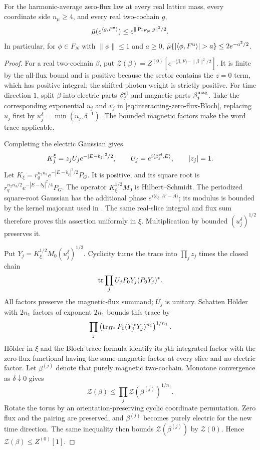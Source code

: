 \begin{proposition}\label{prop:interacting-zero-flux-domination}
For the harmonic-average zero-flux law at every
real lattice mass, every coordinate side
$n_\mu\ge4$, and every real two-cochain $g$,
\begin{equation}\label{eq:interacting-zero-flux-Gaussian}
 \bar\mu(e^{\langle g,F^{\rm u}\rangle})
                  \le e^{\|\operatorname{Pr}_{F_N}g\|^2/2}.
\end{equation}
In particular, for $\phi\in F_N$ with
$\|\phi\|\le1$ and $a\ge0$,
$\bar\mu\{|\langle\phi,F^{\rm u}\rangle|>a\}\le2e^{-a^2/2}$.
\end{proposition}

\begin{proof}
For a real two-cochain $\beta$, put $\mathcal Z(\beta)=
Z^{(0)}[e^{-\langle\beta,F\rangle-\|\beta\|^2/2}]$.
It is finite by the all-flux bound and is
positive because the sector contains the
$z=0$ term, which has positive integral;
the shifted photon weight is strictly positive.
For time direction $1$, split $\beta$
into electric parts $\beta_j^{\rm el}$ and
magnetic parts $\beta_j^{\rm mag}$.
Take the corresponding exponential $u_j$
and $v_j$ in
\eqref{eq:interacting-zero-flux-Bloch}, replacing
$u_j$ first by $u_j^\delta=\min(u_j,\delta^{-1})$.
The bounded magnetic factors make the
word trace applicable.

Completing the electric Gaussian gives
\[
 K_j^\xi=z_jU_j e^{-|E-b_\xi|^2/2},\qquad
 U_j=e^{i\langle\beta_j^{\rm el},E\rangle},\qquad
 |z_j|=1 .
\]
Let $K_\xi=r_q^{n_2n_3}e^{-|E-b_\xi|^2/2}P_G$.
It is positive, and its square root is
$r_q^{n_2n_3/2}e^{-|E-b_\xi|^2/4}P_G$.
The operator $K_\xi^{1/2}M_0$ is Hilbert--Schmidt.
The periodized square-root Gaussian has the
additional phase $e^{i\langle b_\xi,A'-A\rangle}$;
its modulus is bounded by the kernel majorant
used in \cite[(83)]{ChamberLattice}.
The same real-slice integral and flux sum
therefore proves this assertion uniformly
in $\xi$. Multiplication by bounded
$(u_j^\delta)^{1/2}$ preserves it.

Put $Y_j=K_\xi^{1/2}M_0(u_j^\delta)^{1/2}$.
Cyclicity turns the trace into
$\prod_jz_j$ times the closed chain
\[
 \operatorname{tr}\prod_j U_jP_0Y_j(P_0Y_j)^*.
\]
All factors preserve the magnetic-flux
summand; $U_j$ is unitary. Schatten Hölder
\cite[slides~53--56]{PongeSchatten2025}
with $2n_1$ factors of exponent $2n_1$
bounds this trace by
\[
 \prod_j\left(\operatorname{tr}_{H^s}P_0(Y_j^*Y_j)^{n_1}\right)^{1/n_1}.
\]
Hölder in $\xi$ and the Bloch trace formula
identify its $j$th integrated factor with
the zero-flux functional having the same
magnetic factor at every slice and no
electric factor. Let $\beta^{(j)}$ denote
that purely magnetic two-cochain. Monotone
convergence as $\delta\downarrow0$ gives
\[
 \mathcal Z(\beta)\le
                \prod_j\mathcal Z(\beta^{(j)})^{1/n_1}.
\]
Rotate the torus by an orientation-preserving
cyclic coordinate permutation. Zero flux
and the pairing are preserved, and
$\beta^{(j)}$ becomes purely electric for
the new time direction. The same inequality
then bounds $\mathcal Z(\beta^{(j)})$
by $\mathcal Z(0)$. Hence
$\mathcal Z(\beta)\le Z^{(0)}[1]$.


\end{proof}
